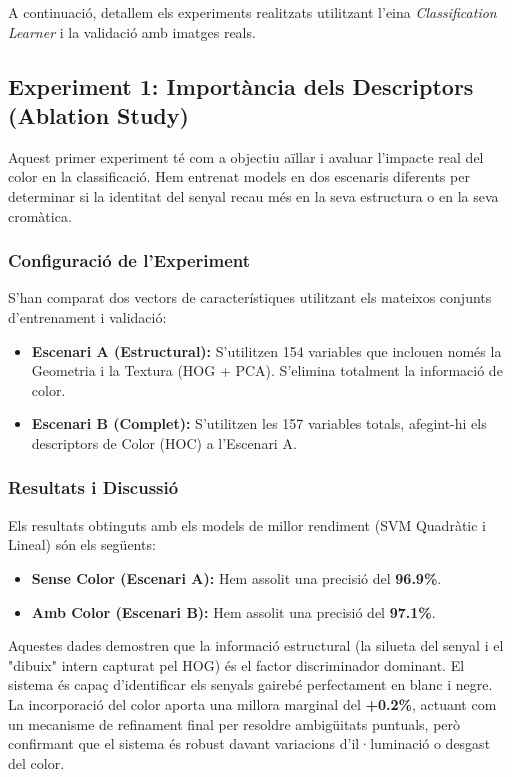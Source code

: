\documentclass[a4paper,12pt]{article}
\begin{document}
A continuació, detallem els experiments realitzats utilitzant l'eina \textit{Classification Learner} i la validació amb imatges reals.

\subsection{Experiment 1: Importància dels Descriptors (Ablation Study)}

Aquest primer experiment té com a objectiu aïllar i avaluar l'impacte real del color en la classificació. Hem entrenat models en dos escenaris diferents per determinar si la identitat del senyal recau més en la seva estructura o en la seva cromàtica.

\subsubsection{Configuració de l'Experiment}
S'han comparat dos vectors de característiques utilitzant els mateixos conjunts d'entrenament i validació:
\begin{itemize}
    \item \textbf{Escenari A (Estructural):} S'utilitzen 154 variables que inclouen només la Geometria i la Textura (HOG + PCA). S'elimina totalment la informació de color.
    \item \textbf{Escenari B (Complet):} S'utilitzen les 157 variables totals, afegint-hi els descriptors de Color (HOC) a l'Escenari A.
\end{itemize}

\subsubsection{Resultats i Discussió}
Els resultats obtinguts amb els models de millor rendiment (SVM Quadràtic i Lineal) són els següents:

\begin{itemize}
    \item \textbf{Sense Color (Escenari A):} Hem assolit una precisió del \textbf{96.9\%}.
    \item \textbf{Amb Color (Escenari B):} Hem assolit una precisió del \textbf{97.1\%}.
\end{itemize}

Aquestes dades demostren que la informació estructural (la silueta del senyal i el "dibuix" intern capturat pel HOG) és el factor discriminador dominant. El sistema és capaç d'identificar els senyals gairebé perfectament en blanc i negre. La incorporació del color aporta una millora marginal del \textbf{+0.2\%}, actuant com un mecanisme de refinament final per resoldre ambigüitats puntuals, però confirmant que el sistema és robust davant variacions d'il·luminació o desgast del color.
\end{document}
